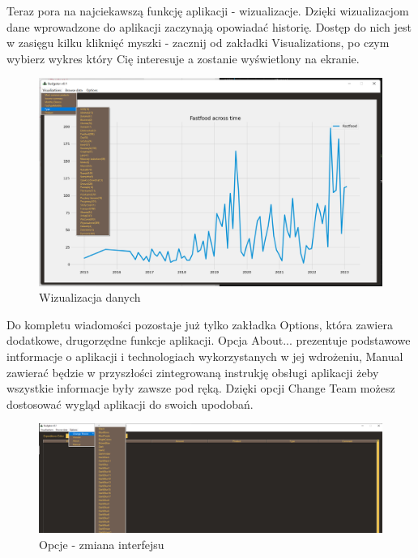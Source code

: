 \documentclass[a4paper,10pt, twoside]{report}
\begin{document}
{Teraz pora na najciekawszą funkcję aplikacji - wizualizacje. Dzięki 
wizualizacjom dane wprowadzone do aplikacji zaczynają opowiadać historię. 
Dostęp do nich jest w zasięgu kilku kliknięć myszki - zacznij od zakładki 
Visualizations, po czym wybierz wykres który Cię interesuje a zostanie 
wyświetlony na ekranie.}

\begin{figure}[H]           %
    \caption{Wizualizacja danych}
    \label{fig:Wizualizacja danych}
    \centering
    \includegraphics[width=12cm]{figures/Interface_Visualizations_v0.3.png}
\end{figure}

{Do kompletu wiadomości pozostaje już tylko zakładka Options, która zawiera 
dodatkowe, drugorzędne funkcje aplikacji. Opcja About... prezentuje podstawowe 
intformacje o aplikacji i technologiach wykorzystanych w jej wdrożeniu, Manual 
zawierać będzie w przyszłości zintegrowaną instrukję obsługi aplikacji żeby 
wszystkie informacje były zawsze pod ręką. Dzięki opcji Change Team możesz 
dostosować wygląd aplikacji do swoich upodobań.}

\begin{figure}[H]           %
    \caption{Opcje - zmiana interfejsu}
    \label{fig:Opcje - zmiana interfejsu}
    \centering
    \includegraphics[width=12cm]{figures/Guide/Budgeter_Instruction_06_Options_Change-theme.png}
\end{figure}
\end{document}
